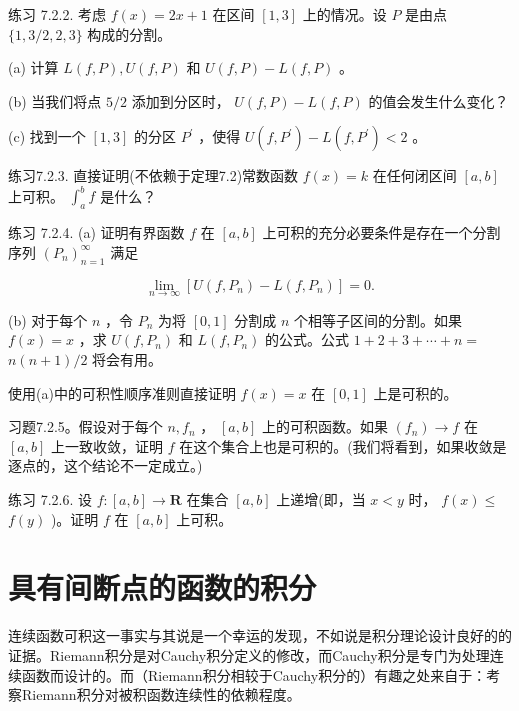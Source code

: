 练习 7.2.2. 考虑 \(f\left( x\right)  = {2x} + 1\) 在区间 \(\left\lbrack  {1,3}\right\rbrack\) 上的情况。设 \(P\) 是由点 \(\{ 1,3/2,2,3\}\) 构成的分割。

(a) 计算 \(L\left( {f,P}\right) ,U\left( {f,P}\right)\) 和 \(U\left( {f,P}\right)  - L\left( {f,P}\right)\) 。

(b) 当我们将点 \(5/2\) 添加到分区时， \(U\left( {f,P}\right)  - L\left( {f,P}\right)\) 的值会发生什么变化？

(c) 找到一个 \(\left\lbrack  {1,3}\right\rbrack\) 的分区 \({P}^{\prime }\) ，使得 \(U\left( {f,{P}^{\prime }}\right)  - L\left( {f,{P}^{\prime }}\right)  < 2\) 。

练习7.2.3. 直接证明(不依赖于定理7.2)常数函数 \(f\left( x\right)  = k\) 在任何闭区间 \(\left\lbrack  {a,b}\right\rbrack\) 上可积。 \({\int }_{a}^{b}f\) 是什么？

练习 7.2.4. (a) 证明有界函数 \(f\) 在 \(\left\lbrack  {a,b}\right\rbrack\) 上可积的充分必要条件是存在一个分割序列 \({\left( {P}_{n}\right) }_{n = 1}^{\infty }\) 满足

\[
\mathop{\lim }\limits_{{n \rightarrow  \infty }}\left\lbrack  {U\left( {f,{P}_{n}}\right)  - L\left( {f,{P}_{n}}\right) }\right\rbrack   = 0.
\]

(b) 对于每个 \(n\) ，令 \({P}_{n}\) 为将 \(\left\lbrack  {0,1}\right\rbrack\) 分割成 \(n\) 个相等子区间的分割。如果 \(f\left( x\right)  = x\) ，求 \(U\left( {f,{P}_{n}}\right)\) 和 \(L\left( {f,{P}_{n}}\right)\) 的公式。公式 \(1 + 2 + 3 + \cdots  + n =\)  \(n\left( {n + 1}\right) /2\) 将会有用。

使用(a)中的可积性顺序准则直接证明 \(f\left( x\right)  = x\) 在 \(\left\lbrack  {0,1}\right\rbrack\) 上是可积的。

习题7.2.5。假设对于每个 \(n,{f}_{n}\) ， \(\left\lbrack  {a,b}\right\rbrack\) 上的可积函数。如果 \(\left( {f}_{n}\right)  \rightarrow  f\) 在 \(\left\lbrack  {a,b}\right\rbrack\) 上一致收敛，证明 \(f\) 在这个集合上也是可积的。(我们将看到，如果收敛是逐点的，这个结论不一定成立。)

练习 7.2.6. 设 \(f : \left\lbrack  {a,b}\right\rbrack   \rightarrow  \mathbf{R}\) 在集合 \(\left\lbrack  {a,b}\right\rbrack\) 上递增(即，当 \(x < y\) 时， \(f\left( x\right)  \leq\)  \(f\left( y\right)\) )。证明 \(f\) 在 \(\left\lbrack  {a,b}\right\rbrack\) 上可积。

\section{具有间断点的函数的积分}
\label{sec:7.3}
连续函数可积这一事实与其说是一个幸运的发现，不如说是积分理论设计良好的的证据。Riemann积分是对Cauchy积分定义的修改，而Cauchy积分是专门为处理连续函数而设计的。而（Riemann积分相较于Cauchy积分的）有趣之处来自于：考察Riemann积分对被积函数连续性的依赖程度。

